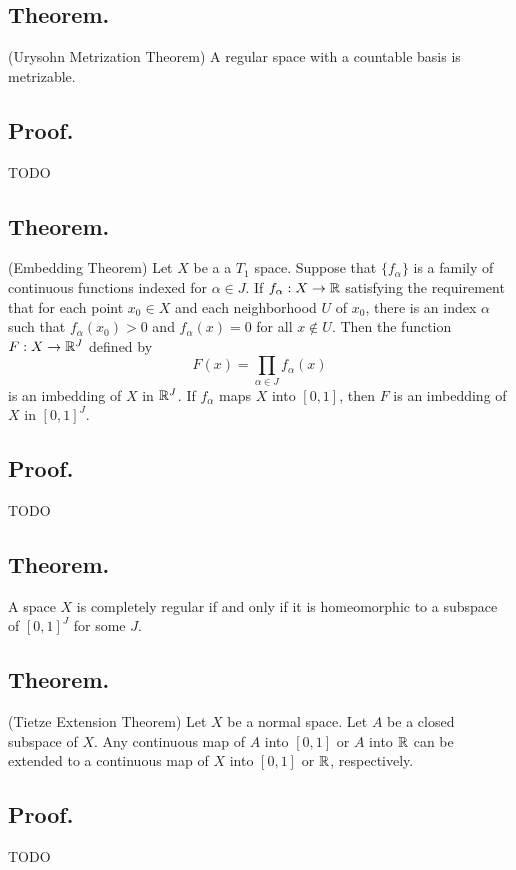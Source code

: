 \documentclass[titlepage]{article}
\begin{document}
\subsection{Theorem.} (Urysohn Metrization Theorem) A regular space with a countable basis is metrizable.

\subsection{Proof.} TODO

\subsection{Theorem.} (Embedding Theorem) Let $X$ be a a $T_{1}$ space. Suppose that $\{f_{\alpha}\}$ is a family of continuous functions indexed for $\alpha \in J$. If $f_{\alpha}: X \to \mathbb{R}$ satisfying the requirement that for each point $x_{0} \in X$ and each neighborhood $U$ of $x_{0}$, there is an index $\alpha$ such that $f_{\alpha}(x_{0}) > 0$ and $f_{\alpha}(x) = 0$ for all $x \not\in U$. Then the function $F: X \to \mathbb{R}^{J}$ defined by 
$$F(x) = \prod_{\alpha \in J} f_{\alpha}(x)$$
is an imbedding of $X$ in $\mathbb{R}^{J}$. If $f_{\alpha}$ maps $X$ into $[0, 1]$, then $F$ is an imbedding of $X$ in $[0, 1]^{J}$.

\subsection{Proof.} TODO

\subsection{Theorem.} A space $X$ is completely regular if and only if it is homeomorphic to a subspace of $[0, 1]^{J}$ for some $J$.

\subsection{Theorem.} (Tietze Extension Theorem) Let $X$ be a normal space. Let $A$ be a closed subspace of $X$. Any continuous map of $A$ into $[0, 1]$ or $A$ into $\mathbb{R}$ can be extended to a continuous map of $X$ into $[0, 1]$ or $\mathbb{R}$, respectively.

\subsection{Proof.} TODO

\newpage {}
\end{document}
